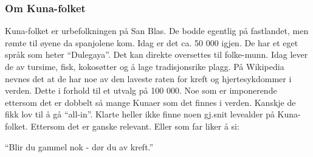 \subsubsection{Om Kuna-folket}
Kuna-folket er urbefolkningen på San Blas. De bodde egentlig på
fastlandet, men rømte til øyene da spanjolene kom. Idag er det ca. 50
000 igjen. De har et eget språk som heter ``Dulegaya''. Det kan
direkte oversettes til folke-munn. Idag lever de av tursime, fisk,
kokosøtter og å lage tradisjonsrike plagg. På Wikipedia nevnes det at
de har noe av den laveste raten for kreft og hjertesykdommer i verden.
Dette i forhold til et utvalg på 100 000. Noe som er imponerende
ettersom det er dobbelt så mange Kunaer som det finnes i verden. Kanskje de
fikk lov til å gå ``all-in''. Klarte heller ikke finne noen gj.snit
levealder på Kuna- folket. Ettersom det er ganske relevant. Eller som
far liker å si:\\ 
\begin{dialogue}
	\item ``Blir du gammel nok - dør du av kreft.''
\end{dialogue}

